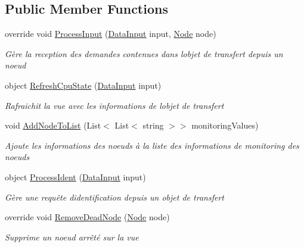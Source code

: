 \subsection*{Public Member Functions}
\begin{DoxyCompactItemize}
\item 
override void \hyperlink{class_node_net_1_1_network_1_1_default_client_a2f6688da612c04b54a102a21401e4d5b}{Process\+Input} (\hyperlink{class_node_net_1_1_data_1_1_data_input}{Data\+Input} input, \hyperlink{class_node_net_1_1_network_1_1_nodes_1_1_node}{Node} node)
\begin{DoxyCompactList}\small\item\em Gère la reception des demandes contenues dans l\textquotesingle{}objet de transfert depuis un noeud \end{DoxyCompactList}\item 
object \hyperlink{class_node_net_1_1_network_1_1_default_client_ac38bbde06cb838bb7b270a2dc49502df}{Refresh\+Cpu\+State} (\hyperlink{class_node_net_1_1_data_1_1_data_input}{Data\+Input} input)
\begin{DoxyCompactList}\small\item\em Rafraichit la vue avec les informations de l\textquotesingle{}objet de transfert \end{DoxyCompactList}\item 
void \hyperlink{class_node_net_1_1_network_1_1_default_client_a6ab3627eaeaddf3be78556bcbbe6ec09}{Add\+Node\+To\+List} (List$<$ List$<$ string $>$$>$ monitoring\+Values)
\begin{DoxyCompactList}\small\item\em Ajoute les informations des noeuds à la liste des informations de monitoring des noeuds \end{DoxyCompactList}\item 
object \hyperlink{class_node_net_1_1_network_1_1_default_client_aa723e87cdf3bfe14eec90e966d60730c}{Process\+Ident} (\hyperlink{class_node_net_1_1_data_1_1_data_input}{Data\+Input} input)
\begin{DoxyCompactList}\small\item\em Gère une requête d\textquotesingle{}identification depuis un objet de transfert \end{DoxyCompactList}\item 
override void \hyperlink{class_node_net_1_1_network_1_1_default_client_a327f7dba7178df6b2adef200ef4b3113}{Remove\+Dead\+Node} (\hyperlink{class_node_net_1_1_network_1_1_nodes_1_1_node}{Node} node)
\begin{DoxyCompactList}\small\item\em Supprime un noeud arrêté sur la vue \end{DoxyCompactList}\end{DoxyCompactItemize}
